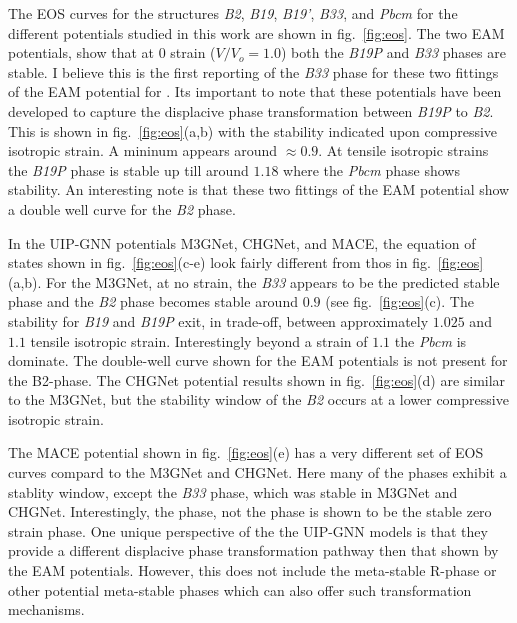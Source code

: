 \documentclass[preprint]{elsarticle}
\begin{document}
The EOS curves for the  structures \textit{B2}, \textit{B19}, \textit{B19'}, \textit{B33}, and \textit{Pbcm}  for the different potentials studied in this work are shown in fig.~\ref{fig:eos}. The two EAM potentials, show that at 0 strain ($V/V_o = 1.0$) both the \textit{B19P} and \textit{B33} phases are stable. I believe this is the first reporting of the \textit{B33} phase for these two fittings of the EAM potential for . Its important to note that these potentials have been developed to capture the displacive phase transformation between \textit{B19P} to \textit{B2}. This is shown in fig.~\ref{fig:eos}(a,b) with the stability indicated upon compressive isotropic strain. A mininum appears around $\approx 0.9$. At tensile isotropic strains the \textit{B19P} phase is stable up till around $1.18$ where the \textit{Pbcm} phase shows stability. An interesting note is that these two fittings of the EAM potential show a double well curve for the \textit{B2} phase. \par

In the UIP-GNN potentials M3GNet, CHGNet, and MACE, the equation of states shown in fig.~\ref{fig:eos}(c-e) look fairly different from thos in fig.~\ref{fig:eos}(a,b). For the M3GNet,  at no strain, the \textit{B33} appears to be the predicted stable phase and the \textit{B2} phase becomes stable around $0.9$ (see fig.~\ref{fig:eos}(c). The stability for \textit{B19} and \textit{B19P} exit, in trade-off, between approximately $1.025$ and $1.1$ tensile isotropic strain. Interestingly beyond a strain of $1.1$ the \textit{Pbcm} is dominate. The double-well curve shown for the EAM potentials is not present for the B2-phase. The CHGNet potential results shown in fig.~\ref{fig:eos}(d) are similar to the M3GNet, but the stability window of the \textit{B2} occurs at a lower compressive isotropic strain. \par

The MACE potential shown in fig.~\ref{fig:eos}(e) has a very different set of EOS curves compard to the M3GNet and CHGNet. Here many of the phases exhibit a stablity window, except the \textit{B33} phase, which was stable in M3GNet and CHGNet. Interestingly, the  phase, not the  phase is shown to be the stable zero strain phase. One unique perspective of the the UIP-GNN models is that they provide a different displacive phase transformation pathway then that shown by the EAM potentials. However, this does not include the meta-stable R-phase or other potential meta-stable phases which can also offer such transformation mechanisms. \par
\end{document}
